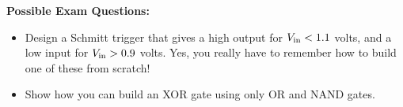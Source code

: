 \textbf{Possible Exam Questions:}

\begin{itemize}

\item Design a Schmitt trigger that gives a high output for $V_{\rm in}<1.1$ volts, and a low input for $V_{\rm in}>0.9$ volts.  Yes, you really have to remember how to build one of these from scratch!

\item Show how you can build an XOR gate using only OR and NAND gates.
\end{itemize}






